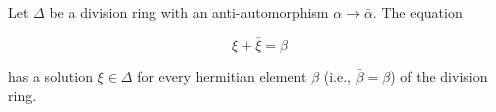 Let $\Delta$ be a division ring with an anti-automorphism $\alpha \rightarrow \bar{\alpha}$. The equation

$$\xi + \bar{\xi} = \beta$$

has a solution $\xi \in \Delta$ for every hermitian element $\beta$ (i.e., $\bar{\beta} = \beta$) of the division ring.
